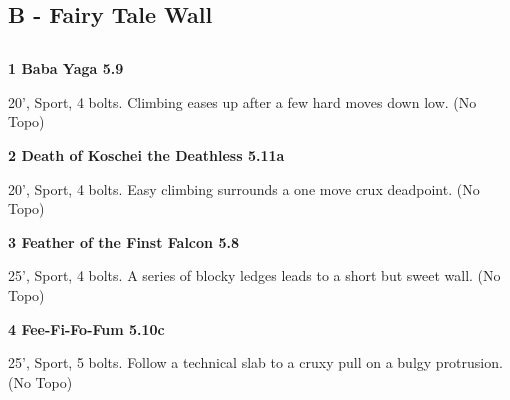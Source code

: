 	\begin{multicols}{2}


\newpage

\section{B - Fairy Tale Wall}\label{sa:Fairy Tale Wall}




\needspace{1.5cm}
\subsection*{}\label{bf:}
	


\needspace{1.5cm}
\label{rt:Baba Yaga}
\colorbox{green!20}{
\parbox{0.95\linewidth}{
\textbf{
1 Baba Yaga 5.9  
}}}

\begin{adjustwidth}{0.5cm}{}			
20', Sport, 4 bolts. Climbing eases up after a few hard moves down low. (No Topo)
\end{adjustwidth}



\needspace{1.5cm}
\label{rt:Death of Koschei the Deathless}
\colorbox{RoyalBlue!20}{
\parbox{0.95\linewidth}{
\textbf{
2 Death of Koschei the Deathless 5.11a  
}}}

\begin{adjustwidth}{0.5cm}{}			
20', Sport, 4 bolts. Easy climbing surrounds a one move crux deadpoint. (No Topo)
\end{adjustwidth}



\needspace{1.5cm}
\label{rt:Feather of the Finst Falcon}
\colorbox{green!20}{
\parbox{0.95\linewidth}{
\textbf{
3 Feather of the Finst Falcon 5.8  
}}}

\begin{adjustwidth}{0.5cm}{}			
25', Sport, 4 bolts. A series of blocky ledges leads to a short but sweet wall. (No Topo)
\end{adjustwidth}



\needspace{1.5cm}
\label{rt:Fee-Fi-Fo-Fum}
\colorbox{RoyalBlue!20}{
\parbox{0.95\linewidth}{
\textbf{
4 Fee-Fi-Fo-Fum 5.10c  
}}}

\begin{adjustwidth}{0.5cm}{}			
25', Sport, 5 bolts. Follow a technical slab to a cruxy pull on a bulgy protrusion. (No Topo)
\end{adjustwidth}





\end{multicols}
